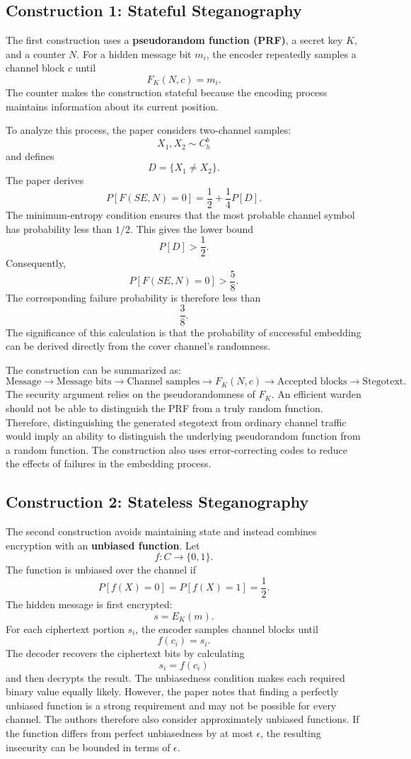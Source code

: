 \documentclass[14pt]{article}
\begin{document}
\subsection{Construction 1: Stateful Steganography}
The first construction uses a \textbf{pseudorandom function (PRF)}, a secret key \(K\), and a counter \(N\).
For a hidden message bit \(m_i\), the encoder repeatedly samples a channel block \(c\) until
\[
F_K(N,c)=m_i.
\]
The counter makes the construction stateful because the encoding process maintains information about its current position.

To analyze this process, the paper considers two-channel samples:
\[
X_1,X_2\sim C_h^b
\]
and defines
\[
D=\{X_1\neq X_2\}.
\]
The paper derives
\[
P[F(SE,N)=0]
=
\frac12+\frac14P[D].
\]
The minimum-entropy condition ensures that the most probable channel symbol has probability less than \(1/2\). This gives the lower bound
\[
P[D]>\frac12.
\]
Consequently,
\[
P[F(SE,N)=0]>\frac58.
\]
The corresponding failure probability is therefore less than
\[
\frac38.
\]
The significance of this calculation is that the probability of successful embedding can be derived directly from the cover channel's randomness.


The construction can be summarized as:
\[
\text{Message}
\rightarrow
\text{Message bits}
\rightarrow
\text{Channel samples}
\rightarrow
F_K(N,c)
\rightarrow
\text{Accepted blocks}
\rightarrow
\text{Stegotext}.
\]
The security argument relies on the pseudorandomness of \(F_K\). An efficient warden should not be able to distinguish the PRF from a truly random function. Therefore, distinguishing the generated stegotext from ordinary channel traffic would imply an ability to distinguish the underlying pseudorandom function from a random function.
The construction also uses error-correcting codes to reduce the effects of failures in the embedding process.
\subsection{Construction 2: Stateless Steganography}
The second construction avoids maintaining state and instead combines encryption with an \textbf{unbiased function}.
Let
\[
f:C\rightarrow\{0,1\}.
\]
The function is unbiased over the channel if
\[
P[f(X)=0]
=
P[f(X)=1]
=
\frac12.
\]
The hidden message is first encrypted:
\[
s=E_K(m).
\]
For each ciphertext portion \(s_i\), the encoder samples channel blocks until
\[
f(c_i)=s_i.
\]
The decoder recovers the ciphertext bits by calculating
\[
s_i=f(c_i)
\]
and then decrypts the result.
The unbiasedness condition makes each required binary value equally likely. However, the paper notes that finding a perfectly unbiased function is a strong requirement and may not be possible for every channel.
The authors therefore also consider approximately unbiased functions. If the function differs from perfect unbiasedness by at most \(\epsilon\), the resulting insecurity can be bounded in terms of \(\epsilon\).
\end{document}
